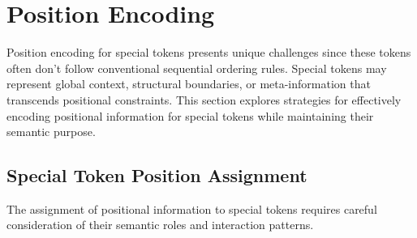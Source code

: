 
\section{Position Encoding}

Position encoding for special tokens presents unique challenges since these tokens often don't follow conventional sequential ordering rules. Special tokens may represent global context, structural boundaries, or meta-information that transcends positional constraints. This section explores strategies for effectively encoding positional information for special tokens while maintaining their semantic purpose.
\begin{comment}
Feedback: Before diving into the specifics, it's helpful to frame the core problem. For example: "A standard position embedding assigns a unique vector to each integer position (0, 1, 2, ...). But what position should we assign to a [CLS] token that represents the entire sequence? Or to a [SEP] token that represents a boundary *between* positions? The strategies in this section address this challenge, exploring ways to assign positional information to special tokens that reflects their functional role rather than just their literal place in the sequence."
\end{comment}

\subsection{Special Token Position Assignment}

The assignment of positional information to special tokens requires careful consideration of their semantic roles and interaction patterns.
\begin{comment}
Feedback: It would be useful to list the common strategies here. For example: "Common strategies include:
1.  **Fixed Position**: Assigning a fixed position ID (e.g., always 0 for [CLS]) regardless of where it appears. This is simple but can be inflexible.
2.  **Type-Based Position**: Assigning a special, learnable 'position embedding' that is the same for all tokens of a certain type (e.g., all [SEP] tokens share one position embedding). This tells the model the token's role, not its location.
3.  **No Position**: Simply not adding a position embedding to certain special tokens, forcing the model to treat them as position-agnostic.
4.  **Relative Position**: Using relative position embeddings, which naturally handle the relationships between special tokens and content tokens without needing to assign absolute positions."
\end{comment}

